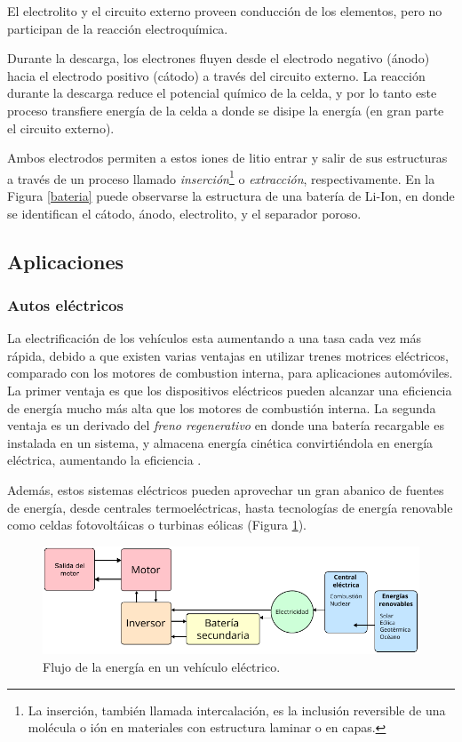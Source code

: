 El electrolito y el circuito externo proveen conducción de los elementos, pero no participan de la reacción electroquímica.

Durante la descarga, los electrones fluyen desde el electrodo negativo (ánodo) hacia el electrodo positivo (cátodo) a través del circuito externo. La reacción durante la descarga reduce el potencial químico de la celda, y por lo tanto este proceso transfiere energía de la celda a donde se disipe la energía (en gran parte el circuito externo).

Ambos electrodos permiten a estos iones de litio entrar y salir de sus estructuras a través de un proceso llamado \emph{inserción}\footnote{La inserción, también llamada intercalación, es la inclusión reversible de una molécula o ión en materiales con estructura laminar o en capas.} o \emph{extracción}, respectivamente. En la Figura \ref{bateria} puede observarse la estructura de una batería de Li-Ion, en donde se identifican el cátodo, ánodo, electrolito, y el separador poroso.

\subsection{Aplicaciones}

\subsubsection{Autos eléctricos}

La electrificación de los vehículos esta aumentando a una tasa cada vez más rápida, debido a que existen varias ventajas en utilizar trenes motrices eléctricos, comparado con los motores de combustion interna, para aplicaciones automóviles. La primer ventaja es que los dispositivos eléctricos pueden alcanzar una eficiencia de energía mucho más alta que los motores de combustión interna. La segunda ventaja es un derivado del \emph{freno regenerativo} en donde una batería recargable es instalada en un sistema, y almacena energía cinética convirtiéndola en energía eléctrica, aumentando la eficiencia \cite{evs&hevs}.

Además, estos sistemas eléctricos pueden aprovechar un gran abanico de fuentes de energía, desde centrales termoeléctricas, hasta tecnologías de energía renovable como celdas fotovoltáicas o turbinas eólicas (Figura \ref{hev}).

\begin{figure}[hbt!]
  \centering
  \includegraphics[width=0.65\columnwidth]{Imágenes/Flujo de la energía en un HEV.pdf}
  \caption{Flujo de la energía en un vehículo eléctrico.}
  \label{hev}
\end{figure}

